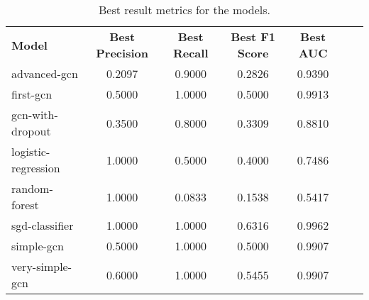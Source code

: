     \begin{table}[ht]
        \centering
        \caption{Best result metrics for the models.}
        \begin{tabular}{lcccccc}
          \textbf{Model}  & \textbf{Best Precision} & \textbf{Best Recall} & \textbf{Best F1 Score} & \textbf{Best AUC} \\
            advanced-gcn & 0.2097 & 0.9000 & 0.2826 & 0.9390 \\
            first-gcn & 0.5000 & 1.0000 & 0.5000 & 0.9913 \\
            gcn-with-dropout & 0.3500 & 0.8000 & 0.3309 & 0.8810 \\
            logistic-regression & 1.0000 & 0.5000 & 0.4000 & 0.7486 \\
            random-forest & 1.0000 & 0.0833 & 0.1538 & 0.5417 \\
            sgd-classifier & 1.0000 & 1.0000 & 0.6316 & 0.9962 \\
            simple-gcn & 0.5000 & 1.0000 & 0.5000 & 0.9907 \\
            very-simple-gcn & 0.6000 & 1.0000 & 0.5455 & 0.9907 \\
        \end{tabular}
    \end{table}
